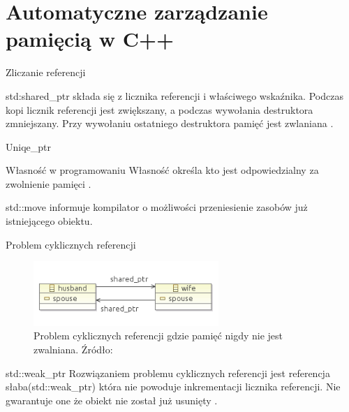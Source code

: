 \documentclass{beamer}
\begin{document}
\section{Automatyczne zarządzanie pamięcią w C++}

\begin{frame}{Zliczanie referencji}
    \begin{block}{}
        std:shared\_ptr składa się z licznika referencji i właściwego wskaźnika. 
        Podczas kopi licznik referencji jest zwiększany, a podczas wywołania destruktora zmniejszany. 
        Przy wywołaniu ostatniego destruktora pamięć jest zwlaniana \cite{cpp-shared-ptr}. 
    \end{block}
\end{frame}


\begin{frame}{Uniqe\_ptr}
    \begin{block}{Własność w programowaniu}
        Własność określa kto jest odpowiedzialny za zwolnienie pamięci \cite{rust-ownership, cpp-unique-ptr}.
    \end{block}

    \begin{block}{}
        std::move informuje kompilator o możliwości przeniesienie zasobów już istniejącego obiektu.
    \end{block}
\end{frame}


\begin{frame}{Problem cyklicznych referencji}
    \begin{figure}
        \centering
        \includegraphics[width=7cm]{cyclic_ref.png}
        \caption{Problem cyklicznych referencji gdzie pamięć nigdy nie jest zwalniana. Źródło: \cite{weak-ptr-vs-magazine}}
        \label{fig:enter-label}
    \end{figure}

\begin{block}{std::weak\_ptr}
    Rozwiązaniem problemu cyklicznych referencji jest referencja słaba(std::weak\_ptr) która nie powoduje inkrementacji licznika referencji. Nie gwarantuje one że obiekt nie został już usunięty \cite{weak-ptr-vs-magazine, cpp-weak-ptr}. 
\end{block}
\end{frame}
\end{document}
